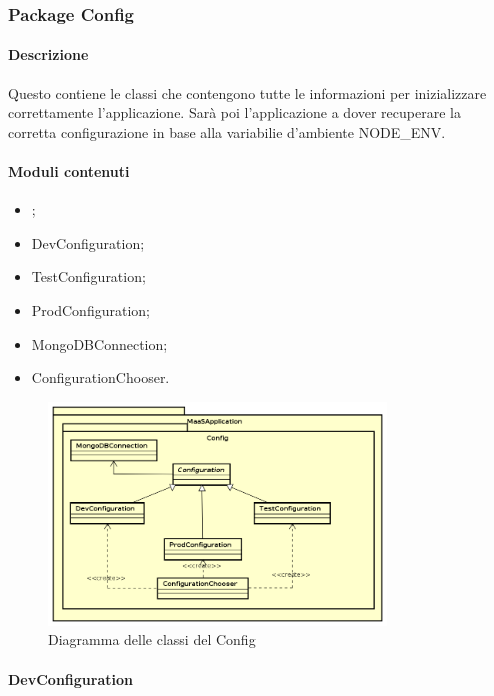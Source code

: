 \subsubsection{Package Config}
\paragraph*{Descrizione}
Questo  contiene le classi  che contengono tutte le informazioni per inizializzare correttamente l'applicazione. 
Sarà poi l'applicazione a dover recuperare la corretta configurazione in base alla variabilie d'ambiente NODE\_ENV.

\paragraph*{Moduli contenuti}
\begin{itemize}
\item {};
\item DevConfiguration;
\item TestConfiguration;
\item ProdConfiguration;
\item MongoDBConnection;
\item ConfigurationChooser.
\end{itemize}

\begin{figure}[H]
\centering
\includegraphics[width=0.8\textwidth]{res/sections/backend/config.png}
\caption{Diagramma delle classi del  Config}
\end{figure}

\paragraph{DevConfiguration}
